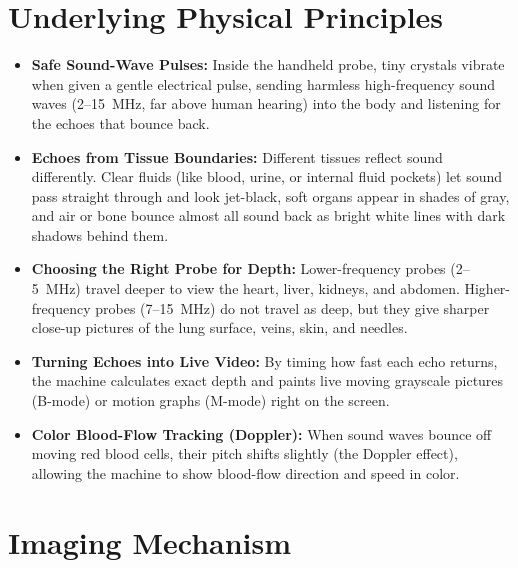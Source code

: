 \section{Underlying Physical Principles}

\begin{itemize}
    \item \textbf{Safe Sound-Wave Pulses:} Inside the handheld probe, tiny crystals vibrate when given a gentle electrical pulse, sending harmless high-frequency sound waves (2--15~MHz, far above human hearing) into the body and listening for the echoes that bounce back.
    \item \textbf{Echoes from Tissue Boundaries:} Different tissues reflect sound differently. Clear fluids (like blood, urine, or internal fluid pockets) let sound pass straight through and look jet-black, soft organs appear in shades of gray, and air or bone bounce almost all sound back as bright white lines with dark shadows behind them.
    \item \textbf{Choosing the Right Probe for Depth:} Lower-frequency probes (2--5~MHz) travel deeper to view the heart, liver, kidneys, and abdomen. Higher-frequency probes (7--15~MHz) do not travel as deep, but they give sharper close-up pictures of the lung surface, veins, skin, and needles.
    \item \textbf{Turning Echoes into Live Video:} By timing how fast each echo returns, the machine calculates exact depth and paints live moving grayscale pictures (B-mode) or motion graphs (M-mode) right on the screen.
    \item \textbf{Color Blood-Flow Tracking (Doppler):} When sound waves bounce off moving red blood cells, their pitch shifts slightly (the Doppler effect), allowing the machine to show blood-flow direction and speed in color.
\end{itemize}

\section{Imaging Mechanism}

